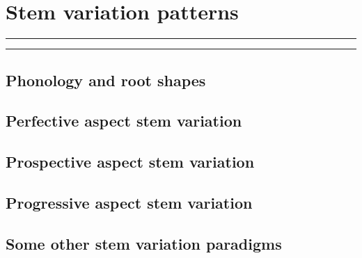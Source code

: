 
\resetexcnt
\chapter{Stem variation patterns}\label{ch:stemvar}

\startcontents[chapters]
\noindent\rule[0.5em]{\textwidth}{\heavyrulewidth}
\noindent\rule{\textwidth}{\heavyrulewidth}
\vspace{1\baselineskip}


\section{Phonology and root shapes}

\section{Perfective aspect stem variation}

\section{Prospective aspect stem variation}

\section{Progressive aspect stem variation}

\section{Some other stem variation paradigms}

\stopcontents[chapters]